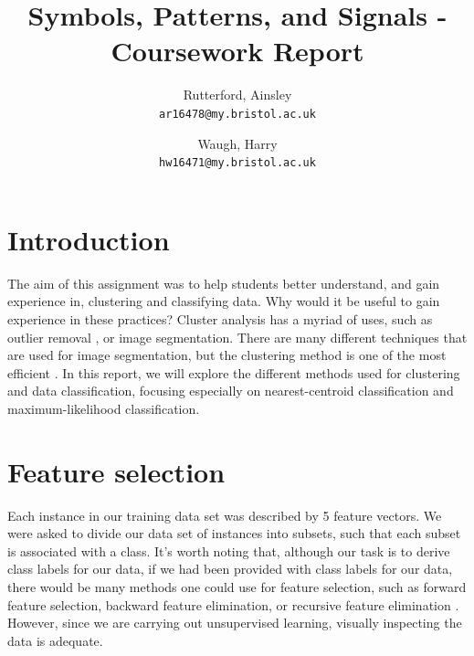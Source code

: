 \documentclass[a4paper]{article}
\title{Symbols, Patterns, and Signals - Coursework Report}
\author{
  Rutterford, Ainsley\\
  \texttt{ar16478@my.bristol.ac.uk}
  \and
  Waugh, Harry\\
  \texttt{hw16471@my.bristol.ac.uk}
}
\begin{document}
\maketitle
\section{Introduction}

The aim of this assignment was to help students better understand, and gain experience in, clustering and classifying data. Why would it be useful to gain experience in these practices? Cluster analysis has a myriad of uses, such as outlier removal \cite{outlierremoval}, or image segmentation. There are many different techniques that are used for image segmentation, but the clustering method is one of the most efficient \cite{imagesegment}. In this report, we will explore the different methods used for clustering and data classification, focusing especially on nearest-centroid  classification and maximum-likelihood classification.

\section{Feature selection}

Each instance in our training data set was described by 5 feature vectors. We were asked to divide our data set of instances into subsets, such that each subset is associated with a class. It's worth noting that, although our task is to derive class labels for our data, if we had been provided with class labels for our data, there would be many methods one could use for feature selection, such as  forward feature selection, backward feature elimination, or recursive feature elimination \cite{featureselection}. However, since we are carrying out unsupervised learning, visually inspecting the data is adequate.
\end{document}
